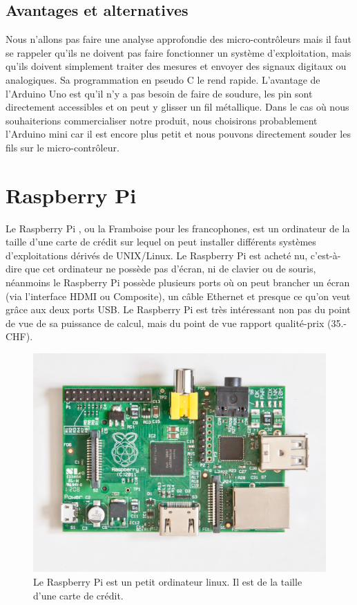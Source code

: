 \documentclass[a4paper,11pt]{report}
\begin{document}
{\subsection{Avantages et alternatives}
Nous n'allons pas faire une analyse approfondie des micro-contrôleurs mais il faut se rappeler qu'ils ne doivent pas faire fonctionner un système d'exploitation, mais qu'ils doivent simplement traiter des mesures et envoyer des signaux digitaux ou analogiques. Sa programmation en pseudo C le rend rapide. L'avantage de l'Arduino Uno est qu'il n'y a pas besoin de faire de soudure, les pin sont directement accessibles et on peut y glisser un fil métallique. Dans le cas où nous souhaiterions commercialiser notre produit, nous choisirons probablement l'Arduino mini car il est encore plus petit et nous pouvons directement souder les fils sur le micro-contrôleur.

\section{Raspberry Pi}
Le Raspberry Pi \cite{RaspberryPiCaracteristiques}, ou la Framboise pour les francophones, est un ordinateur de la taille d'une carte de crédit sur lequel on peut installer différents systèmes d'exploitations dérivés de UNIX/Linux. Le Raspberry Pi est acheté nu, c'est-à-dire que cet ordinateur ne possède pas d'écran, ni de clavier ou de souris, néanmoins le Raspberry Pi possède plusieurs ports où on peut brancher un écran (via l'interface HDMI ou Composite), un câble Ethernet et presque ce qu'on veut grâce aux deux ports USB. Le Raspberry Pi est très intéressant non pas du point de vue de sa puissance de calcul, mais du point de vue rapport qualité-prix (35.- CHF).

\begin{figure}[h]
\includegraphics[width = 1.0\textwidth]{RaspberryPi.jpg}
\caption[Raspberry Pi]{\label{RaspberryPi} Le Raspberry Pi est un petit ordinateur linux. Il est de la taille d'une carte de crédit.}
\end{figure}

}
\end{document}
